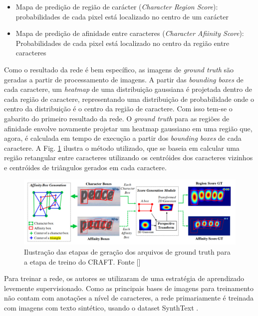 \begin{itemize}
    \item {Mapa de predição de região de carácter (\textit{Character Region Score}): probabilidades de cada pixel está localizado no centro de um carácter}
    \item {Mapa de predição de afinidade entre caracteres (\textit{Character Afiinity Score}): Probabilidades de cada  pixel está localizado no centro da região entre caracteres}
\end{itemize}

Como o resultado da rede é bem específico, as imagens de \textit{ground truth} são geradas a partir de processamento de imagens. A partir das \textit{bounding boxes} de cada caractere, um \textit{heatmap} de uma distribuição gaussiana é projetada dentro de cada região de caractere, representando uma distribuição de probabilidade onde o centro da distribuição é o centro da região de caractere. Com isso tem-se o gabarito do primeiro resultado da rede. O \textit{ground truth} para as regiões de afinidade envolve novamente projetar um heatmap gaussiano em uma região que, agora, é calculada em tempo de execução a partir dos \textit{bounding boxes} de cada caractere. A Fig. \ref{fig:craft_gt}  ilustra o método utilizado, que se baseia em calcular uma região retangular entre caracteres utilizando os centróides dos caracteres vizinhos e centróides de triângulos gerados em cada caractere.

\begin{figure}
    \centering
    \includegraphics[width=\textwidth]{figs/craft-gt.png}
    \caption{Ilustração das etapas de geração dos arquivos de ground truth para a etapa de treino do CRAFT. Fonte []}
    \label{fig:craft_gt}
\end{figure}

Para treinar a rede, os autores se utilizaram de uma estratégia de aprendizado levemente supervisionado. Como as principais bases de imagens para treinamento não contam com anotações a nível de caracteres, a rede primariamente é treinada com imagens com texto sintético, usando o dataset SynthText \cite{SynthText}.


